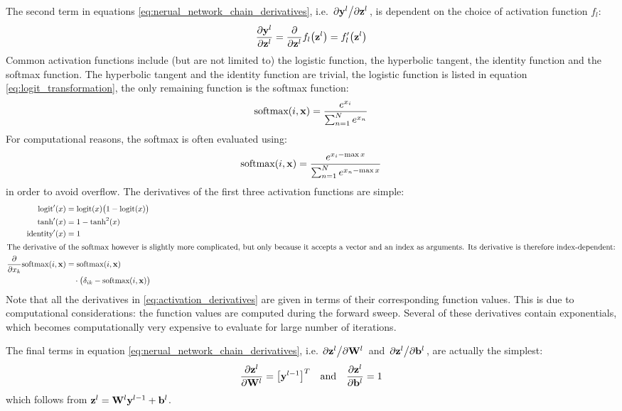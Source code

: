 \documentclass[nofootinbib,reprint,english]{revtex4-1}
\newcommand{\W}{\vb{W}}
\begin{document}
The second term in equations \eqref{eq:nerual_network_chain_derivatives}, i.e. \(\pdv*{\vb{y}^l}{\vb{z}^l}\), is dependent on the choice of activation function \(f_l\):
\begin{equation}\label{eq:derivative_activation}
\pdv{\vb{y}^l}{\vb{z}^l}=\pdv{\vb{z}^l}f_l\big(\vb{z}^l\big)=f_l'\big(\vb{z}^l\big)
\end{equation}
Common activation functions include (but are not limited to) the logistic function, the hyperbolic tangent, the identity function and the softmax function. The hyperbolic tangent and the identity function are trivial, the logistic function is listed in equation \eqref{eq:logit_transformation}, the only remaining function is the softmax function:
\begin{equation}\label{eq:softmax}
\text{softmax}(i,\vb{x})=\frac{e^{x_i}}{\sum_{n=1}^Ne^{x_n}}
\end{equation}
For computational reasons, the softmax is often evaluated using:
\[\text{softmax}(i,\vb{x})=\frac{e^{x_i-\max x}}{\sum_{n=1}^Ne^{x_n-\max x}}\]
in order to avoid overflow. The derivatives of the first three activation functions are simple:
\begin{subequations}\label{eq:activation_derivatives}
\begin{align}
\text{logit}'(x)&=\text{logit}(x)\big(1-\text{logit}(x)\big)\\
\tanh'(x)&=1-\tanh^2(x)\\
\text{identity}'(x)&=1\\
\intertext{The derivative of the softmax however is slightly more complicated, but only because it accepts a vector and an index as arguments. Its derivative is therefore index-dependent:}
\pdv{x_k}\text{softmax}(i,\vb{x})&=\text{softmax}(i,\vb{x})\nonumber\\
&\quad\cdot\big(\delta_{ik}-\text{softmax}(i,\vb{x})\big)
\end{align}
\end{subequations}
Note that all the derivatives in \eqref{eq:activation_derivatives} are given in terms of their corresponding function values. This is due to computational considerations: the function values are computed during the forward sweep. Several of these derivatives contain exponentials, which becomes computationally very expensive to evaluate for large number of iterations.

The final terms in equation \eqref{eq:nerual_network_chain_derivatives}, i.e. \(\pdv*{\vb{z}^l}{\vb{\W}^l}\) and \(\pdv*{\vb{z}^l}{\vb{b}^l}\), are actually the simplest:
\begin{equation}\label{eq:z_derivatives_W_and_b}
\pdv{\vb{z}^l}{\vb{\W}^l}=\big[\vb{y}^{l-1}\big]^T\qand\pdv{\vb{z}^l}{\vb{b}^l}=1
\end{equation}
which follows from \(\vb{z}^l=\W^l\vb{y}^{l-1}+\vb{b}^l\).
\end{document}

